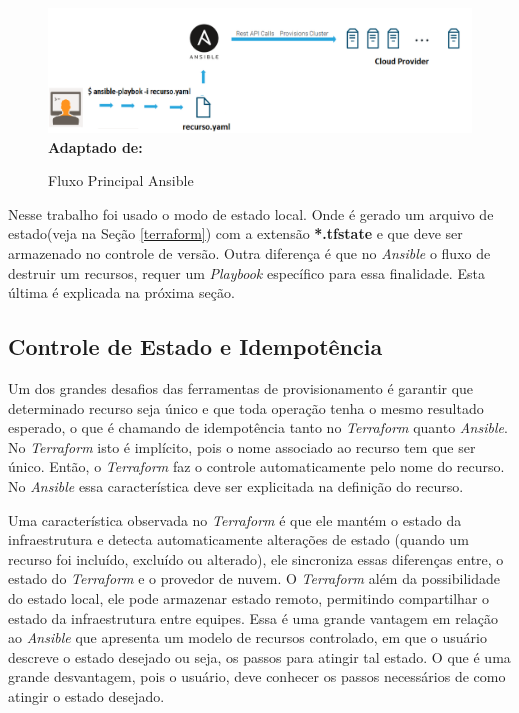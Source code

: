 \begin{figure}[H]
	\centering	
	\caption[\hspace{0.1cm}Fluxo Principal Ansible]{Fluxo Principal Ansible}
	\vspace{-0.4cm}
	\includegraphics[width=1.1\textwidth]{artigo/figuras/Ansible_workflow2.png}
	 \vspace{-0.2cm}
	\\\textbf{\footnotesize Adaptado de: \cite{cloudera}}
	\label{fig:figura10}
\end{figure}
\vspace{-0.5cm}

\hfill

 Nesse trabalho foi usado o modo de estado local. Onde é gerado um arquivo de estado(veja na Seção \ref{terraform}) com a extensão \textbf{*.tfstate} e que deve ser armazenado no controle de versão. Outra diferença é que no \textit{Ansible} o fluxo de destruir um recursos, requer um \textit{Playbook} específico para essa finalidade. Esta última é explicada na próxima seção.  

\subsection{Controle de Estado e Idempotência} \label{idem}
Um dos grandes desafios das ferramentas de provisionamento é garantir que determinado recurso seja único e que toda operação tenha o mesmo resultado esperado, o que é chamando de idempotência tanto no \textit{Terraform} quanto \textit{Ansible}. No \textit{Terraform} isto é implícito, pois o nome associado ao recurso tem que ser único. Então, o \textit{Terraform} faz o controle automaticamente pelo nome do recurso. No \textit{Ansible} essa característica deve ser  explicitada  na definição do recurso.

Uma característica observada no \textit{Terraform} é que ele mantém o estado da infraestrutura e detecta automaticamente alterações de estado (quando um recurso foi incluído, excluído ou alterado), ele sincroniza essas diferenças entre, o estado do \textit{Terraform} e o provedor de nuvem. O \textit{Terraform} além da possibilidade do estado local, ele pode armazenar estado remoto, permitindo compartilhar o estado da infraestrutura entre equipes. Essa é uma grande vantagem em relação ao \textit{Ansible} que apresenta um modelo de recursos controlado, em que o usuário descreve o estado desejado ou seja, os passos para atingir tal estado. O que é uma grande desvantagem, pois o usuário, deve conhecer os passos necessários de como atingir o estado desejado. 

